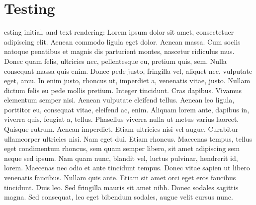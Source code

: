 %
%
\let\textcircled=\pgftextcircled
\chapter{Testing}
\label{chapter:testing}

esting initial, and text rendering: Lorem ipsum dolor sit amet, consectetuer adipiscing elit. Aenean commodo ligula eget dolor. Aenean massa. Cum sociis natoque penatibus et magnis dis parturient montes, nascetur ridiculus mus. Donec quam felis, ultricies nec, pellentesque eu, pretium quis, sem. Nulla consequat massa quis enim. Donec pede justo, fringilla vel, aliquet nec, vulputate eget, arcu. In enim justo, rhoncus ut, imperdiet a, venenatis vitae, justo. Nullam dictum felis eu pede mollis pretium. Integer tincidunt. Cras dapibus. Vivamus elementum semper nisi. Aenean vulputate eleifend tellus. Aenean leo ligula, porttitor eu, consequat vitae, eleifend ac, enim. Aliquam lorem ante, dapibus in, viverra quis, feugiat a, tellus. Phasellus viverra nulla ut metus varius laoreet. Quisque rutrum. Aenean imperdiet. Etiam ultricies nisi vel augue. Curabitur ullamcorper ultricies nisi. Nam eget dui. Etiam rhoncus. Maecenas tempus, tellus eget condimentum rhoncus, sem quam semper libero, sit amet adipiscing sem neque sed ipsum. Nam quam nunc, blandit vel, luctus pulvinar, hendrerit id, lorem. Maecenas nec odio et ante tincidunt tempus. Donec vitae sapien ut libero venenatis faucibus. Nullam quis ante. Etiam sit amet orci eget eros faucibus tincidunt. Duis leo. Sed fringilla mauris sit amet nibh. Donec sodales sagittis magna. Sed consequat, leo eget bibendum sodales, augue velit cursus nunc.

\newpage

